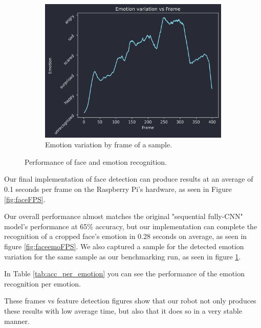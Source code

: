 \begin{figure}[h]
\begin{subfigure}[t]{0.32\textwidth}
        \centering
        \includegraphics[width = \textwidth]{resources/emotionvsframe.png}
        \caption{Emotion variation by frame of a sample.}\label{fig:emotionvsframe}
    \end{subfigure}
    \caption{Performance of face and emotion recognition.}\label{fig:face_emo_bigtable}
\end{figure}



Our final implementation of face detection can produce results at an average of 0.1 seconds per frame on the Raspberry Pi's hardware, as seen in Figure \ref{fig:faceFPS}.


Our overall performance almost matches the original "sequential fully-CNN" model's performance at 65\% accuracy, but our implementation can complete the recognition of a cropped face's emotion in 0.28 seconds on average, as seen in figure \ref{fig:faceemoFPS}. We also captured a sample for the detected emotion variation for the same sample as our benchmarking run, as seen in figure \ref{fig:emotionvsframe}.





In Table \ref{tab:acc_per_emotion} you can see the performance of the emotion recognition per emotion.

These frames vs feature detection figures show that our robot not only produces these results with low average time, but also that it does so in a very stable manner.

